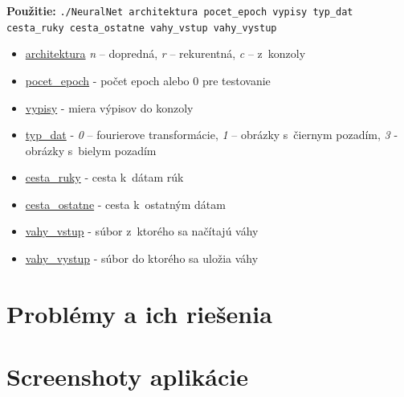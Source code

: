 \textbf{Použitie:} {\tt ./NeuralNet architektura pocet\_epoch vypisy typ\_dat cesta\_ruky cesta\_ostatne vahy\_vstup vahy\_vystup}
\begin{itemize}
\item \underline{architektura} \textit{n} -- dopredná, \textit{r} -- rekurentná, \textit{c} -- z~konzoly
\item \underline{pocet\_epoch} - počet epoch alebo 0 pre testovanie
\item \underline{vypisy} - miera výpisov do konzoly
\item \underline{typ\_dat} - \textit{0} -- fourierove transformácie, \textit{1} -- obrázky s~čiernym pozadím, \textit{3} - obrázky s~bielym pozadím
\item \underline{cesta\_ruky} - cesta k~dátam rúk
\item \underline{cesta\_ostatne} - cesta k~ostatným dátam
\item \underline{vahy\_vstup} - súbor z~ktorého sa načítajú váhy
\item \underline{vahy\_vystup} - súbor do ktorého sa uložia váhy
\end{itemize}


\section{Problémy a ich riešenia}
\todo

\section{Screenshoty aplikácie}
\todo